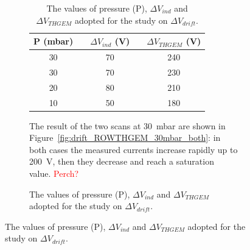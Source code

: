 \documentclass[a4paper, 11 pt]{article}
\newcommand{\Vind}{$\Delta V_{ind}$}
\newcommand{\Vthgem}{$\Delta V_{THGEM}$}
\newcommand{\Vdrift}{$ \Delta V_{drift}$}
\begin{document}
\begin{figure}[htbp]
\begin{figure}[htbp]
\begin{table} [!h]
	\begin{center}
		\renewcommand{\arraystretch}{1.2}
		\begin{tabular} {ccccc}
			P (mbar) & & \Vind{} (V) & & \Vthgem{} (V)\\
			\toprule[0.1em]
			30	& &	70	& &	240 \\
			30	& &	70	& & 230 \\
			20	& & 80	& & 210 \\
			10	& & 50	& & 180 \\
			
			\bottomrule[0.1em]
		\end{tabular}
	\end{center}
	\caption{The values of pressure (P), \Vind{} and \Vthgem{} adopted for the study on \Vdrift.} \label{tab:ROWTHGEM_vdrift}
\end{table}


The result of the two scans at 30~mbar are shown in Figure~\ref{fig:drift_ROWTHGEM_30mbar_both}: in both cases the measured currents increase rapidly up to 200~V, then they decrease and reach a saturation value. 
\textcolor{red}{Perch?}



\end{figure}
\end{figure}
\end{document}
